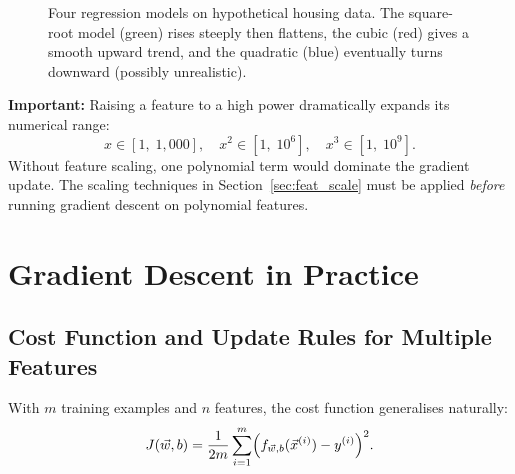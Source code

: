 \begin{figure}[h]
\centering
{}
\caption{Four regression models on hypothetical housing data. The square-root
model (green) rises steeply then flattens, the cubic (red) gives a smooth
upward trend, and the quadratic (blue) eventually turns downward
(possibly unrealistic).}
\label{fig:poly}
\end{figure}

\textbf{Important:} Raising a feature to a high power dramatically expands its
numerical range:
\[
x\in[1,\;1{,}000],\quad
x^2\in[1,\;10^6],\quad
x^3\in[1,\;10^9].
\]
Without feature scaling, one polynomial term would dominate the gradient
update. The scaling techniques in Section~\ref{sec:feat_scale} must be applied
\emph{before} running gradient descent on polynomial features.

\section{Gradient Descent in Practice}

\subsection{Cost Function and Update Rules for Multiple Features}

With $m$ training examples and $n$ features, the cost function generalises
naturally:
\begin{equation}
J(\vec{w},b)=\frac{1}{2m}\sum_{i=1}^{m}
\Bigl(f_{\vec{w},b}(\vec{x}^{(i)})-y^{(i)}\Bigr)^2.
\label{eq:mlr-cost}
\end{equation}

